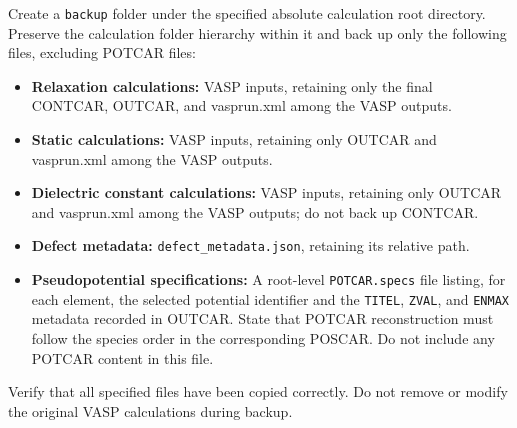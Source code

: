 \documentclass[aip,jap,reprint,amsmath,amssymb]{revtex4-2}
\begin{document}
Create a \texttt{backup} folder under the specified absolute calculation root directory. Preserve the calculation folder hierarchy within it and back up only the following files, excluding POTCAR files:
\begin{itemize}
    \item \textbf{Relaxation calculations:} VASP inputs, retaining only the final CONTCAR, OUTCAR, and vasprun.xml among the VASP outputs.
    \item \textbf{Static calculations:} VASP inputs, retaining only OUTCAR and vasprun.xml among the VASP outputs.
    \item \textbf{Dielectric constant calculations:} VASP inputs, retaining only OUTCAR and vasprun.xml among the VASP outputs; do not back up CONTCAR.
    \item \textbf{Defect metadata:} \texttt{defect\_metadata.json}, retaining its relative path.
    \item \textbf{Pseudopotential specifications:} A root-level \texttt{POTCAR.specs} file listing, for each element, the selected potential identifier and the \texttt{TITEL}, \texttt{ZVAL}, and \texttt{ENMAX} metadata recorded in OUTCAR. State that POTCAR reconstruction must follow the species order in the corresponding POSCAR. Do not include any POTCAR content in this file.
\end{itemize}
Verify that all specified files have been copied correctly. Do not remove or modify the original VASP calculations during backup.
\end{document}
